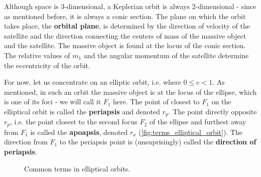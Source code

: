 Although space is 3-dimensional, a Keplerian orbit is always 2-dimensional - since as mentioned before, it is always a conic section. The plane on which the orbit takes place, the \textbf{orbital plane}, is determined by the direction of velocity of the satellite and the direction connecting the centers of mass of the massive object and the satellite. The massive object is found at the locus of the conic section. The relative values of $m_{1}$ and the angular momentum of the satellite determine the eccentricity of the orbit.

For now, let us concentrate on an elliptic orbit, i.e. where $0\leq e < 1$. As mentioned, in such an orbit the massive object is at the locus of the ellipse, which is one of its foci - we will call it $F_{1}$ here. The point of closest to $F_{1}$ on the elliptical orbit is called the \textbf{periapsis} and denoted $r_{p}$. The point directly opposite $r_{p}$, i.e. the point closest to the second focus $F_{2}$ of the ellipse and furthest away from $F_{1}$ is called the \textbf{apoapsis}, denoted $r_{a}$ (\autoref{fig:terms_elliptical_orbit}). The direction from $F_{1}$ to the periapsis point is (unsuprisingly) called the \textbf{direction of periapsis}.

\begin{figure}
	\begin{center}
	\end{center}
	\caption{Common terms in elliptical orbits.}
	\label{fig:terms_elliptical_orbit}
\end{figure}


